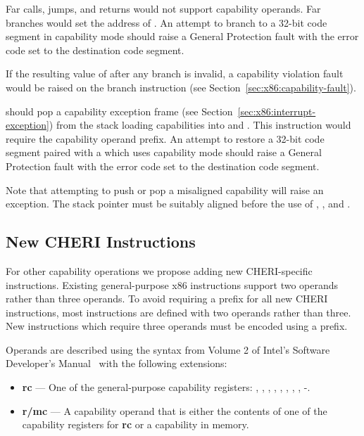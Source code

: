 Far calls, jumps, and returns would not support capability operands.
Far branches would
set the address of \CIP{}.  An attempt to branch to a 32-bit code
segment in capability mode should raise a General Protection fault
with the error code set to the destination code segment.

If the resulting value of \CIP{} after any branch
is invalid, a capability violation fault would be raised on the branch
instruction (see Section~\ref{sec:x86:capability-fault}).

 should pop a capability exception frame (see
Section~\ref{sec:x86:interrupt-exception}) from the stack loading
capabilities into \CIP{} and \CSP{}.  This instruction would require
the capability operand prefix.  An attempt to restore a 32-bit code
segment paired with a \CIP{} which uses capability mode should raise a
General Protection fault with the error code set to the destination
code segment.

Note that attempting to push or pop a misaligned capability will raise
an exception.  The stack pointer must be suitably aligned before the
use of , , and .

\subsection{New CHERI Instructions}

For other capability operations we
propose adding new CHERI-specific instructions.
Existing general-purpose x86 instructions support two operands rather
than three operands.  To avoid requiring a \VEX{} prefix for all new
CHERI instructions, most instructions are defined with two operands
rather than three.  New instructions which require three operands must
be encoded using a \VEX{} prefix.

Operands are described using the syntax from Volume 2 of Intel's
Software Developer's Manual~\cite{intel-sdm-vol2} with the following
extensions:

\begin{itemize}
  \item \textbf{rc} { }---{ } One of the general-purpose capability
    registers: \CAX{}, \CBX{}, \CCX{}, \CDX{}, \CDI{}, \CSI{}, \CBP{},
    \CSP{}, -.

  \item \textbf{r/mc} { }---{ } A capability operand that is either
    the contents of one of the capability registers for \textbf{rc} or
    a capability in memory.
\end{itemize}

